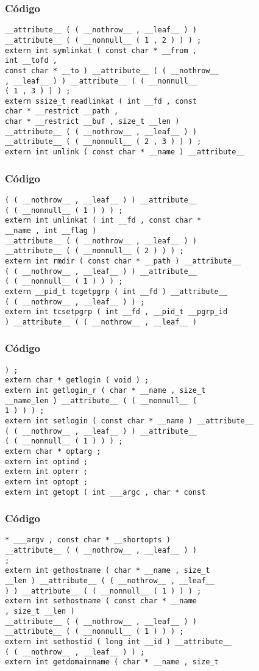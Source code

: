 \documentclass{beamer}
\begin{document}
\begin{frame}[fragile]
\frametitle{C\'odigo}
\begin{verbatim}
__attribute__ ( ( __nothrow__ , __leaf__ ) ) 
__attribute__ ( ( __nonnull__ ( 1 , 2 ) ) ) ; 
extern int symlinkat ( const char * __from , 
int __tofd , 
const char * __to ) __attribute__ ( ( __nothrow__ 
, __leaf__ ) ) __attribute__ ( ( __nonnull__ 
( 1 , 3 ) ) ) ; 
extern ssize_t readlinkat ( int __fd , const 
char * __restrict __path , 
char * __restrict __buf , size_t __len ) 
__attribute__ ( ( __nothrow__ , __leaf__ ) ) 
__attribute__ ( ( __nonnull__ ( 2 , 3 ) ) ) ; 
extern int unlink ( const char * __name ) __attribute__ 
\end{verbatim}
\end{frame}
\begin{frame}[fragile]
\frametitle{C\'odigo}
\begin{verbatim}
( ( __nothrow__ , __leaf__ ) ) __attribute__ 
( ( __nonnull__ ( 1 ) ) ) ; 
extern int unlinkat ( int __fd , const char * 
__name , int __flag ) 
__attribute__ ( ( __nothrow__ , __leaf__ ) ) 
__attribute__ ( ( __nonnull__ ( 2 ) ) ) ; 
extern int rmdir ( const char * __path ) __attribute__ 
( ( __nothrow__ , __leaf__ ) ) __attribute__ 
( ( __nonnull__ ( 1 ) ) ) ; 
extern __pid_t tcgetpgrp ( int __fd ) __attribute__ 
( ( __nothrow__ , __leaf__ ) ) ; 
extern int tcsetpgrp ( int __fd , __pid_t __pgrp_id 
) __attribute__ ( ( __nothrow__ , __leaf__ ) 
\end{verbatim}
\end{frame}
\begin{frame}[fragile]
\frametitle{C\'odigo}
\begin{verbatim}
) ; 
extern char * getlogin ( void ) ; 
extern int getlogin_r ( char * __name , size_t 
__name_len ) __attribute__ ( ( __nonnull__ ( 
1 ) ) ) ; 
extern int setlogin ( const char * __name ) __attribute__ 
( ( __nothrow__ , __leaf__ ) ) __attribute__ 
( ( __nonnull__ ( 1 ) ) ) ; 
extern char * optarg ; 
extern int optind ; 
extern int opterr ; 
extern int optopt ; 
extern int getopt ( int ___argc , char * const 
\end{verbatim}
\end{frame}
\begin{frame}[fragile]
\frametitle{C\'odigo}
\begin{verbatim}
* ___argv , const char * __shortopts ) 
__attribute__ ( ( __nothrow__ , __leaf__ ) ) 
; 
extern int gethostname ( char * __name , size_t 
__len ) __attribute__ ( ( __nothrow__ , __leaf__ 
) ) __attribute__ ( ( __nonnull__ ( 1 ) ) ) ; 
extern int sethostname ( const char * __name 
, size_t __len ) 
__attribute__ ( ( __nothrow__ , __leaf__ ) ) 
__attribute__ ( ( __nonnull__ ( 1 ) ) ) ; 
extern int sethostid ( long int __id ) __attribute__ 
( ( __nothrow__ , __leaf__ ) ) ; 
extern int getdomainname ( char * __name , size_t 
\end{verbatim}
\end{frame}
\end{document}
